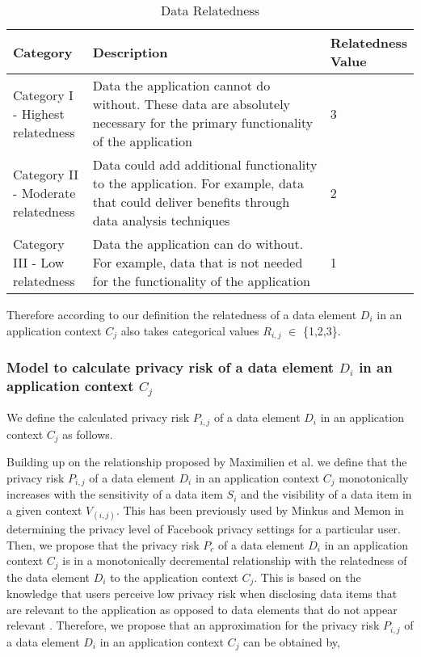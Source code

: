 \documentclass[10pt]{article}
\begin{document}
\begin{center}
\begin{table}[htbp]
\caption{Data Relatedness}
\begin{center}
\begin{adjustbox}{width=0.5\textwidth} 
\begin{tabular}{|p{0.2\linewidth}|p{0.7\linewidth}|p{0.1\linewidth}|} 
\hline
Category & Description & Relatedness Value \\
\hline
Category I - Highest relatedness & Data the application cannot do without. These data are absolutely necessary for the primary functionality of the application & 3 \\
\hline
Category II - Moderate relatedness & Data could add additional functionality to the application. For example, data that could deliver benefits through data analysis techniques & 2 \\
\hline
Category III - Low relatedness & Data the application can do without. For example, data that is not needed for the functionality of the application & 1 \\
\hline
\end{tabular}
\end{adjustbox}
\end{center}
\end{table}
\end{center} 
Therefore according to our definition the relatedness of a data element \textit {$D_i$} in an application context \textit {$C_j$} also takes categorical values \textit {$R_{i,j}$} $\in$ \{1,2,3\}.

\subsubsection{Model to calculate privacy risk of a data element \textit {$D_i$} in an application context \textit {$C_j$} }

We define the calculated privacy risk \textit{$P_{i,j}$} of a data element \textit {$D_i$} in an application context \textit {$C_j$} as follows.

Building up on the relationship proposed by Maximilien et al. \cite {maximilien2009privacy} we define that the privacy risk \textit{$P_{i,j}$} of a data element \textit {$D_i$} in an application context \textit {$C_j$}  monotonically increases with the sensitivity of a data item \textit{$S_i$} and the visibility of a data item in a given context \textit{$V_{(i,j)}$}. This has been previously used by Minkus and Memon \cite{minkus2014scale} in determining the privacy level of Facebook privacy settings for a particular user. Then, we propose that the privacy risk \textit{$P_c$} of a data element \textit {$D_i$} in an application context \textit {$C_j$} is in a monotonically decremental relationship with the relatedness of the data element \textit {$D_i$} to the application context \textit {$C_j$}. This is based on the knowledge that users perceive low privacy risk when disclosing data items that are relevant to the application as opposed to data elements that do not appear relevant \cite {knijnenburg2013helping}. Therefore, we propose that an approximation for the privacy risk \textit{$P_{i,j}$} of a data element \textit {$D_i$} in an application context \textit {$C_j$} can be obtained by,
\end{document}
